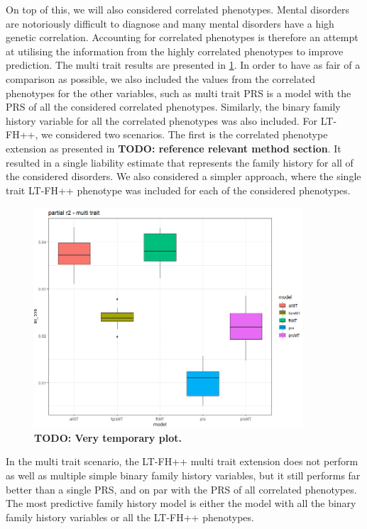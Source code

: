On top of this, we will also considered correlated phenotypes. Mental disorders are notoriously difficult to diagnose and many mental 
disorders have a high genetic correlation. Accounting for correlated phenotypes is therefore an attempt at utilising the information 
from the highly correlated phenotypes to improve prediction. The multi trait results are presented in 
\cref{fig:paper3:predictionResultsMultiTrait}. In order to have as fair of a comparison as possible, we also included the values from 
the correlated phenotypes for the other variables, such as multi trait PRS is a model with the PRS of all the considered correlated 
phenotypes. Similarly, the binary family history variable for all the correlated phenotypes was also included. For LT-FH++, we 
considered two scenarios. The first is the correlated phenotype extension as presented in \textbf{TODO: reference relevant method 
section}. It resulted in a single liability estimate that represents the family history for all of the considered disorders. We also 
considered a simpler approach, where the single trait LT-FH++ phenotype was included for each of the considered phenotypes.


\begin{figure}
	\includegraphics[width=10cm]{results/adhd_predictive_power_multitrait.png}
	\caption[Out of sample multi trait prediction performance]{\textbf{TODO: Very temporary plot.}}
	\label{fig:paper3:predictionResultsMultiTrait}
\end{figure}


In the multi trait scenario, the LT-FH++ multi trait extension does not perform as well as multiple simple binary family history 
variables, but it still performs far better than a single PRS, and on par with the PRS of all correlated phenotypes. The most 
predictive family history model is either the model with all the binary family history variables or all the LT-FH++ phenotypes.